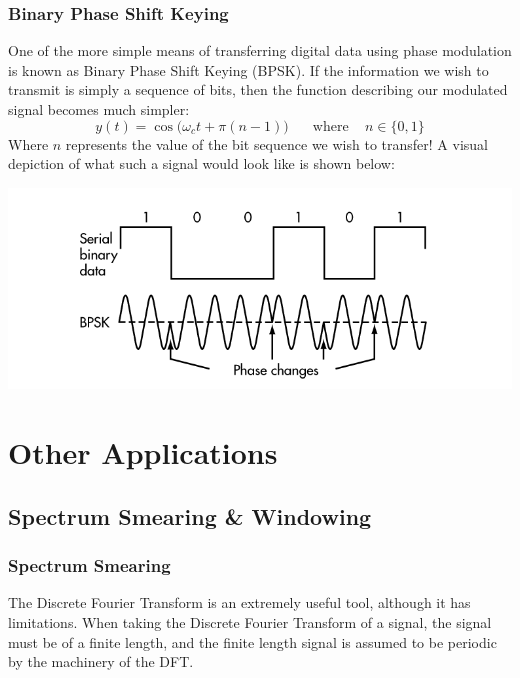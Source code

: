 \documentclass[a4paper]{article}
\numberwithin{equation}{section}
\begin{document}
\subsubsection{Binary Phase Shift Keying}
One of the more simple means of transferring digital data using phase modulation is known as Binary Phase Shift Keying (BPSK). If the information we wish to transmit is simply a sequence of bits, then the function describing our modulated signal becomes much simpler:
\begin{equation}
y(t)=\cos{\big(\omega_ct + \pi (n-1) \big)} \; \; \; \; \; \text{ where } \; \; \; n \in \{0,1\}
\end{equation}
Where $n$ represents the value of the bit sequence we wish to transfer! A visual depiction of what such a signal would look like is shown below:
\begin{center}
\includegraphics[scale=0.45]{BPSK.png}
\end{center}


\section{Other Applications}
\subsection{Spectrum Smearing \& Windowing}
\subsubsection{Spectrum Smearing}
The Discrete Fourier Transform is an extremely useful tool, although it has limitations. When taking the Discrete Fourier Transform of a signal, the signal must be of a finite length, and the finite length signal is assumed to be periodic by the machinery of the DFT.\\
\end{document}
